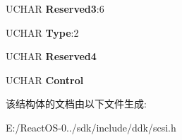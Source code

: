 \begin{DoxyCompactItemize}
U\+C\+H\+AR {\bfseries Reserved3}\+:6
\item 
\mbox{\label{struct___c_d_b_1_1___s_c_a_n___c_d_aaf2905b3b091ba9abf66a1328fe7361e}} 
U\+C\+H\+AR {\bfseries Type}\+:2
\item 
\mbox{\label{struct___c_d_b_1_1___s_c_a_n___c_d_a8226e73b2572715b8223f1229e695a4a}} 
U\+C\+H\+AR {\bfseries Reserved4}
\item 
\mbox{\label{struct___c_d_b_1_1___s_c_a_n___c_d_ad9de8d9d2df69c2380e232dac5b57d40}} 
U\+C\+H\+AR {\bfseries Control}
\end{DoxyCompactItemize}


该结构体的文档由以下文件生成\+:\begin{DoxyCompactItemize}
\item 
E\+:/\+React\+O\+S-\/0../sdk/include/ddk/scsi.\+h\end{DoxyCompactItemize}
